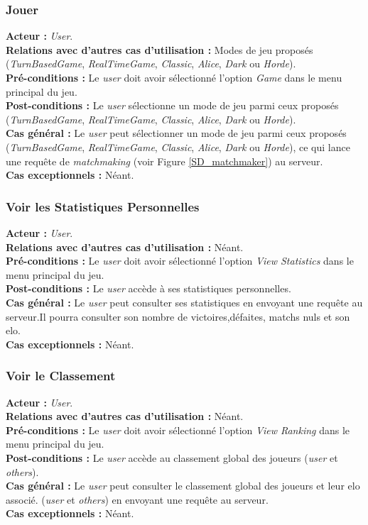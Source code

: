 \documentclass[10pt, a4paper]{article}
\begin{document}
\subsubsection{Jouer}
\textbf{Acteur :} \textit{User}.\\
\textbf{Relations avec d'autres cas d'utilisation :} Modes de jeu proposés (\textit{TurnBasedGame}, \textit{RealTimeGame}, \textit{Classic}, \textit{Alice}, \textit{Dark} ou \textit{Horde}).\\
\textbf{Pré-conditions :} Le \textit{user} doit avoir sélectionné l'option \textit{Game} dans le menu principal du jeu.\\
\textbf{Post-conditions :} Le  \textit{user} sélectionne un mode de jeu parmi ceux proposés (\textit{TurnBasedGame}, \textit{RealTimeGame}, \textit{Classic}, \textit{Alice}, \textit{Dark} ou \textit{Horde}).\\
\textbf{Cas général :} Le  \textit{user} peut sélectionner un mode de jeu parmi ceux proposés (\textit{TurnBasedGame}, \textit{RealTimeGame}, \textit{Classic}, \textit{Alice}, \textit{Dark} ou \textit{Horde}), ce qui lance une requête de \textit{matchmaking} (voir Figure \ref{SD_matchmaker}) au serveur.\\
\textbf{Cas exceptionnels :} Néant.



\subsubsection{Voir les Statistiques Personnelles}
\textbf{Acteur :} \textit{User}.\\
\textbf{Relations avec d'autres cas d'utilisation :} Néant.\\
\textbf{Pré-conditions :} Le \textit{user} doit avoir sélectionné l'option \textit{View Statistics} dans le menu principal du jeu.\\
\textbf{Post-conditions :} Le \textit{user} accède à ses statistiques personnelles.\\
\textbf{Cas général :} Le \textit{user} peut consulter ses statistiques en envoyant une requête au serveur.Il pourra consulter son nombre de victoires,défaites, matchs nuls et son elo.\\
\textbf{Cas exceptionnels :} Néant.

\subsubsection{Voir le Classement}
\textbf{Acteur :} \textit{User}.\\
\textbf{Relations avec d'autres cas d'utilisation :} Néant.\\
\textbf{Pré-conditions :} Le \textit{user} doit avoir sélectionné l'option \textit{View Ranking} dans le menu principal du jeu.\\
\textbf{Post-conditions :} Le \textit{user} accède au classement global des joueurs (\textit{user} et \textit{others}).\\
\textbf{Cas général :} Le \textit{user} peut consulter le classement global des joueurs et leur elo associé. (\textit{user} et \textit{others}) en envoyant une requête au serveur.\\
\textbf{Cas exceptionnels :} Néant.
\end{document}
